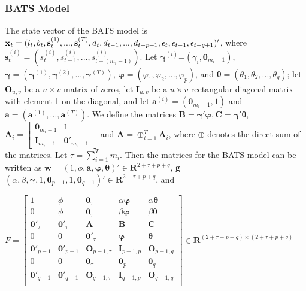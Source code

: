 \documentclass{uwstat572}
\begin{document}
\subsubsection{BATS Model}
\hspace{4ex}The state vector of the BATS model is $\textbf{x}_t=(l_t,b_t,\textbf{s}_t^{(1)},...,\textbf{s}_t^{(T)}, d_t, d_{t-1},..., d_{t-p+1}, \epsilon_t, \epsilon_{t-1},\\ \epsilon_{t-q+1} )'$, 
where $\textbf{s}_t^{(i)}=(s_t^{(i)}, s_{t-1}^{(i)} ,..., s_{t-(m_i-1)}^{(i)}  )$. Let $\bm{\gamma}^{(i)}$=$(\gamma_i, \textbf{0}_{m_i-1})$, $\bm{\gamma}=(\bm{\gamma}^{(1)},\bm{\gamma}^{(2)},...,\bm{\gamma}^{(T)})$, $\bm{\varphi}=(\varphi_1, \varphi_2,..., \varphi_p)$, and $\bm{\theta}=(\theta_1,\theta_2,...,\theta_q)$; let $\textbf{O}_{u,v}$ be a $u \times v$ matrix of zeros, let $\textbf{I}_{u,v}$ be a $u \times v$ rectangular diagonal matrix with element 1 on the diagonal, and let $\textbf{a}^{(i)}=(\textbf{0}_{m_i-1},1)$ and $\textbf{a}=(\textbf{a}^{(1)},...,\textbf{a}^{(T)})$. We define the matrices $\textbf{B}=\bm{\gamma}'\bm{\varphi}, \textbf{C}=\bm{\gamma}'\bm{\theta}$, $\textbf{A}_i=\begin{bmatrix} 
\textbf{0}_{m_i-1} &1 \\ 
\textbf{I}_{m_i-1} & \textbf{0}'_{m_i-1} 
\end{bmatrix}$ and $\textbf{A}=\oplus _{i=1}^T \textbf{A}_i$, where $\oplus$ denotes the direct sum of the matrices. Let $\tau=\sum_{i=1}^{T} m_i$. 
Then the matrices for the BATS model can be written as $\textbf{w}=(1,\phi,\textbf{a}, \bm{\varphi}, \bm{\theta})' \in \mathbf{R}^{2+\tau+p+q}$, \textbf{g}=$(\alpha,\beta,\bm{\gamma}, 1, \textbf{0}_{p-1}, 1, \textbf{0}_{q-1})'\in \mathbf{R}^{2+\tau+p+q}$, and 

\begin{center}
$F=\begin{bmatrix} 
1 & \phi& \textbf{0}_\tau & \alpha \bm{\varphi} & \alpha \bm{\theta}  \\
0 & \phi& \textbf{0}_\tau & \beta \bm{\varphi} & \beta \bm{\theta}  \\
\textbf{0}'_\tau &  \textbf{0}'_\tau  & \bm{A} & \bm{B} & \bm{C} \\
0 & 0 & \textbf{0}'_\tau & \bm{\varphi} & \bm{\theta}  \\
\bm{0}'_{p-1} & \bm{0}'_{p-1} & \textbf{O}_{p-1,\tau} & \bm{I}_{p-1,p} &\textbf{O}_{p-1,q} \\
0 & 0 &\textbf{0}_\tau & \textbf{0}_p & \textbf{0}_q \\
\bm{0}'_{q-1} & \bm{0}'_{q-1} & \textbf{O}_{q-1,\tau} & \bm{I}_{q-1,p} &\textbf{O}_{q-1,q} \\
\end{bmatrix} \in \mathbf{R}^{(2+\tau+p+q) \times (2+\tau+p+q)}$ 
\end{center}
\end{document}
